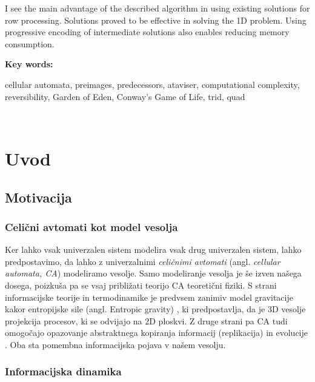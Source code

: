 \documentclass[12pt,a4paper,openany,twoside]{book}
\begin{document}
I see the main advantage of the described algorithm
in using existing solutions for row processing.
Solutions proved to be effective in solving the 1D problem.
Using progressive encoding of intermediate solutions
also enables reducing memory consumption.

\vspace{1.3cm}
\noindent
{\large \bf Key words:}

\vspace{0.5cm}
\noindent
cellular automata, preimages, predecessors, ataviser, computational complexity, reversibility, Garden of Eden, Conway's Game of Life, trid, quad
\newpage

\ \thispagestyle{empty}
\newpage


\chapter{Uvod}

\section{Motivacija}

\subsection{Celični avtomati kot model vesolja}

Ker lahko vsak univerzalen sistem modelira vsak drug univerzalen sistem, lahko predpostavimo,
da lahko z univerzalnimi \emph{celičnimi avtomati} (angl. \emph{cellular automata, CA}) modeliramo vesolje. Samo modeliranje vesolja
je še izven našega dosega, poizkuša pa se vsaj približati teorijo CA teoretični fiziki.
S strani informacijske teorije in termodinamike je predvsem zanimiv model gravitacije
kakor entropijske sile (angl. Entropic gravity) \cite{Verlinde2010}, ki predpostavlja, da je
3D vesolje projekcija procesov, ki se odvijajo na 2D ploskvi. Z druge strani pa CA tudi omogočajo
opazovanje abstraktnega kopiranja informacij (replikacija) in evolucije \cite{Salzberg2004}.
Oba sta pomembna informacijska pojava v našem vesolju.

\subsection{Informacijska dinamika}
\end{document}

